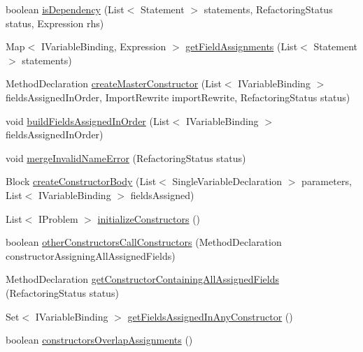 \begin{DoxyCompactItemize}
\item 
boolean \hyperlink{classedu_1_1illinois_1_1canistelCassabanana_1_1RemoveDuplicateCodeInConstructorsRefactoring_a8d60b7d4ca0281b8d167341107cac1bb}{isDependency} (List$<$ Statement $>$ statements, RefactoringStatus status, Expression rhs)
\item 
Map$<$ IVariableBinding, Expression $>$ \hyperlink{classedu_1_1illinois_1_1canistelCassabanana_1_1RemoveDuplicateCodeInConstructorsRefactoring_a4af7b99035dc86798fe1135fd561d2dd}{getFieldAssignments} (List$<$ Statement $>$ statements)
\item 
MethodDeclaration \hyperlink{classedu_1_1illinois_1_1canistelCassabanana_1_1RemoveDuplicateCodeInConstructorsRefactoring_aeef473ec640a8297ef1417d01e466ab1}{createMasterConstructor} (List$<$ IVariableBinding $>$ fieldsAssignedInOrder, ImportRewrite importRewrite, RefactoringStatus status)
\item 
void \hyperlink{classedu_1_1illinois_1_1canistelCassabanana_1_1RemoveDuplicateCodeInConstructorsRefactoring_a1a64a890de0360ea805f6e17e9a10fc2}{buildFieldsAssignedInOrder} (List$<$ IVariableBinding $>$ fieldsAssignedInOrder)
\item 
void \hyperlink{classedu_1_1illinois_1_1canistelCassabanana_1_1RemoveDuplicateCodeInConstructorsRefactoring_a0a783fefaf72092436886cf392cf4e64}{mergeInvalidNameError} (RefactoringStatus status)
\item 
Block \hyperlink{classedu_1_1illinois_1_1canistelCassabanana_1_1RemoveDuplicateCodeInConstructorsRefactoring_a49ce4ec62df0a8a7e6ef1fbe340fad40}{createConstructorBody} (List$<$ SingleVariableDeclaration $>$ parameters, List$<$ IVariableBinding $>$ fieldsAssigned)
\item 
List$<$ IProblem $>$ \hyperlink{classedu_1_1illinois_1_1canistelCassabanana_1_1RemoveDuplicateCodeInConstructorsRefactoring_aae064b83438d410e2fa557ba720caf16}{initializeConstructors} ()
\item 
boolean \hyperlink{classedu_1_1illinois_1_1canistelCassabanana_1_1RemoveDuplicateCodeInConstructorsRefactoring_ab246bbd3f947f4f5c10bbdc9611c53b8}{otherConstructorsCallConstructors} (MethodDeclaration constructorAssigningAllAssignedFields)
\item 
MethodDeclaration \hyperlink{classedu_1_1illinois_1_1canistelCassabanana_1_1RemoveDuplicateCodeInConstructorsRefactoring_a424e97defc26248f5a8d1ff30878b4ee}{getConstructorContainingAllAssignedFields} (RefactoringStatus status)
\item 
Set$<$ IVariableBinding $>$ \hyperlink{classedu_1_1illinois_1_1canistelCassabanana_1_1RemoveDuplicateCodeInConstructorsRefactoring_a0d8043ead99af436fa1b441fe2772a13}{getFieldsAssignedInAnyConstructor} ()
\item 
boolean \hyperlink{classedu_1_1illinois_1_1canistelCassabanana_1_1RemoveDuplicateCodeInConstructorsRefactoring_a7d729e8c3255c6f08bf347f717adf426}{constructorsOverlapAssignments} ()
\end{DoxyCompactItemize}
